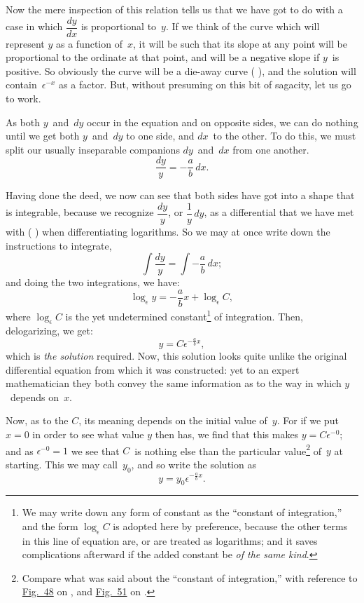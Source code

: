 \documentclass[12pt]{book}[2005/09/16]
\newcommand{\DPPageSep}[2]{\Pagelabel{#2}}
\newcommand{\Pagelabel}[1]
  {\phantomsection\label{#1}}
\newcommand{\Pageref}[2][p.]{%
  \ifthenelse{\not\equal{#1}{}}{%
    \hyperref[#2]{#1~\pageref*{#2}}%
  }{%
    \hyperref[#2]{\pageref{*#2}}%
  }%
}
\newcommand{\Fig}[1]{\hyperref[fig:#1]{Fig.~#1}}
\newcommand{\efrac}[2]{\frac{#1}{#2}}
\begin{document}
Now the mere inspection of this relation tells us
that we have got to do with a case in which $\dfrac{dy}{dx}$ is
proportional to~$y$. If we think of the curve which
will represent $y$ as a function of~$x$, it will be such
that its slope at any point will be proportional to
the ordinate at that point, and will be a negative
slope if $y$~is positive. So obviously the curve will
be a die-away curve (\Pageref{section:5}), and the solution will
contain~$\epsilon^{-x}$ as a factor. But, without presuming on
this bit of sagacity, let us go to work.

As both $y$~and~$dy$ occur in the equation and on
opposite sides, we can do nothing until we get both
$y$~and~$dy$ to one side, and $dx$~to the other. To do
this, we must split our usually inseparable companions
$dy$~and~$dx$ from one another.
\[
\frac{dy}{y} = - \frac{a}{b}\, dx.
\]

Having done the deed, we now can see that both
sides have got into a shape that is integrable, because
we recognize $\dfrac{dy}{y}$, or $\dfrac{1}{y}\, dy$, as a differential that we
have met with (\Pageref{expolo}) when differentiating logarithms.
So we may at once write down the instructions to
integrate,
\[
\int \frac{dy}{y} = \int -\frac{a}{b}\, dx;
\]
and doing the two integrations, we have:
\[
\log_\epsilon y = -\frac{a}{b} x + \log_\epsilon C,
\]
\DPPageSep{248.png}{236}%
where $\log_\epsilon C$ is the yet undetermined constant\footnote
  {We may write down any form of constant as the ``constant of
  integration,'' and the form $\log_\epsilon C$ is adopted here by preference,
  because the other terms in this line of equation are, or are treated
  as logarithms; and it saves complications afterward if the added
  constant be \emph{of the same kind}.}
of
integration. Then, delogarizing, we get:
\[
y = C \epsilon^{-\efrac{a}{b} x},
\]
which is \emph{the solution} required. Now, this solution
looks quite unlike the original differential equation
from which it was constructed: yet to an expert
mathematician they both convey the same information
as to the way in which $y$~depends on~$x$.

Now, as to the $C$, its meaning depends on the
initial value of~$y$. For if we put $x = 0$ in order to
see what value $y$ then has, we find that this makes
$y = C \epsilon^{-0}$; and as $\epsilon^{-0} = 1$ we see that $C$~is nothing else
than the particular value\footnote
  {Compare what was said about the ``constant of integration,''
  with reference to \Fig{48} on \Pageref{constant}, and \Fig{51} on \Pageref{fig:51}.}
 of~$y$ at starting. This we
may call~$y_0$, and so write the solution as
\[
y = y_0 \epsilon^{-\efrac{a}{b} x}.
\]
\end{document}
